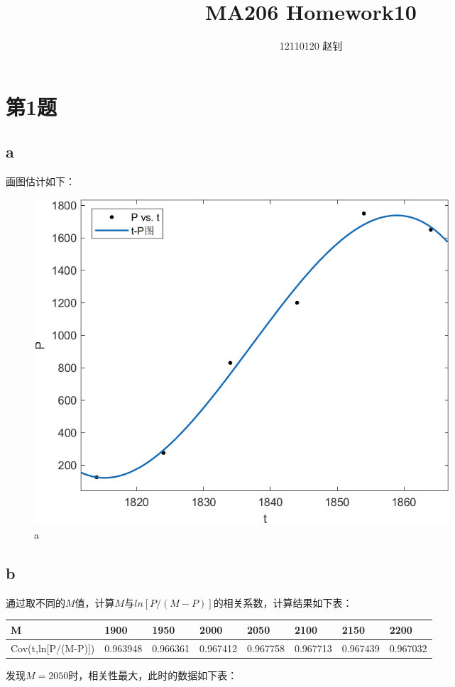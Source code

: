 \documentclass{article}
\title{MA206 Homework10}
\author{12110120 赵钊}
\date{}
\begin{document}
\maketitle


\section{第1题}
\subsection{a}
画图估计如下：
\begin{figure}[!h]
    \centering
    \includegraphics[width=0.75\textwidth]{pic/hw10_01.png}
    \caption{a}
\end{figure}

\subsection{b}
通过取不同的$M$值，计算$M$与$ln\left[P/(M-P)\right]$的相关系数，计算结果如下表：
\begin{table}[!ht]
    \centering
    \begin{tabular}{|l|l|l|l|l|l|l|l|}
    \hline
        M & 1900 & 1950 & 2000 & 2050 & 2100 & 2150 & 2200 \\ \hline
        Cov(t,ln[P/(M-P)]) & 0.963948 & 0.966361 & 0.967412 & 0.967758 & 0.967713 & 0.967439 & 0.967032 \\ \hline
    \end{tabular}
\end{table}

\newpage

发现$M = 2050$时，相关性最大，此时的数据如下表：
\end{document}

